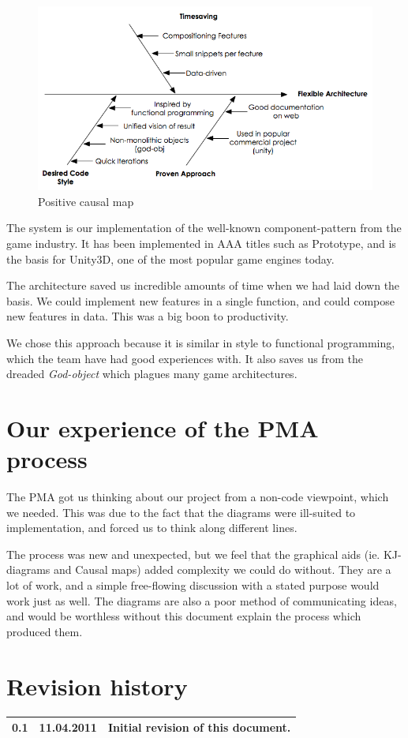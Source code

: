 \documentclass[titlepage,a4paper,11pt]{article}
\begin{document}
\begin{figure}
    \begin{center}
    \includegraphics[width=\linewidth]{graphics/posMap}
    \caption{Positive causal map}
    \label{fig:posmap}
    \end{center}
\end{figure}

The system is our implementation of the well-known component-pattern from
the game industry. It has been implemented in AAA titles such as Prototype,
and is the basis for Unity3D, one of the most popular game engines today.

The architecture saved us incredible amounts of time when we had laid down
the basis. We could implement new features in a single function, and could
compose new features in data. This was a big boon to productivity.

We chose this approach because it is similar in style to functional 
programming, which the team have had good experiences with. It also saves
us from the dreaded \emph{God-object} which plagues many game 
architectures.

\section{Our experience of the PMA process}

The PMA got us thinking about our project from a non-code viewpoint, which
we needed. This was due to the fact that the diagrams were ill-suited to
implementation, and forced us to think along different lines.

The process was new and unexpected, but we feel that the graphical aids
(ie. KJ-diagrams and Causal maps) added complexity we could do without.
They are a lot of work, and a simple free-flowing discussion with a stated
purpose would work just as well.  The diagrams are also a poor method of
communicating ideas, and would be worthless without this document explain
the process which produced them.

\printbibliography


\section{Revision history}

\begin{table}[H]
  \begin{tabular}{| c | c | c |}
    \hline
    0.1 & 11.04.2011 & Initial revision of this document. \\
    \hline
  \end{tabular}
\end{table}
\end{document}
